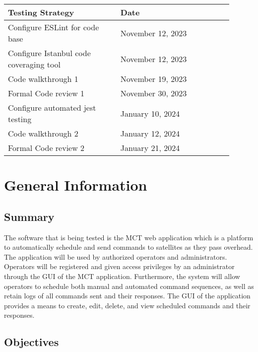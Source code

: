 \documentclass[12pt, titlepage]{article}
\begin{document}
\begin{longtable}{|p{0.45\linewidth}|p{0.45\linewidth}|}
\hline
\textbf{Testing Strategy} & \textbf{Date} \\
\hline
Configure ESLint for code base & November 12, 2023 \\
\hline
Configure Istanbul code coveraging tool & November 12, 2023 \\
\hline
Code walkthrough 1 & November 19, 2023 \\
\hline
Formal Code review 1 & November 30, 2023 \\
\hline
Configure automated jest testing & January 10, 2024 \\
\hline
Code walkthrough 2 & January 12, 2024 \\
\hline
Formal Code review 2 & January 21, 2024 \\
\hline

\end{longtable}


\section{General Information}

\subsection{Summary}

The software that is being tested is the MCT web application which is a platform to automatically schedule and send commands to satellites as they
pass overhead. The application will be used by authorized operators and administrators. Operators will be registered and given access privileges by an administrator through the GUI of the MCT application. Furthermore, the system will allow operators to schedule both manual and automated command sequences, as well as retain logs of all commands sent and their responses. The GUI of the application provides a means to create, edit, delete, and view scheduled commands and their responses.

\subsection{Objectives}
\end{document}
